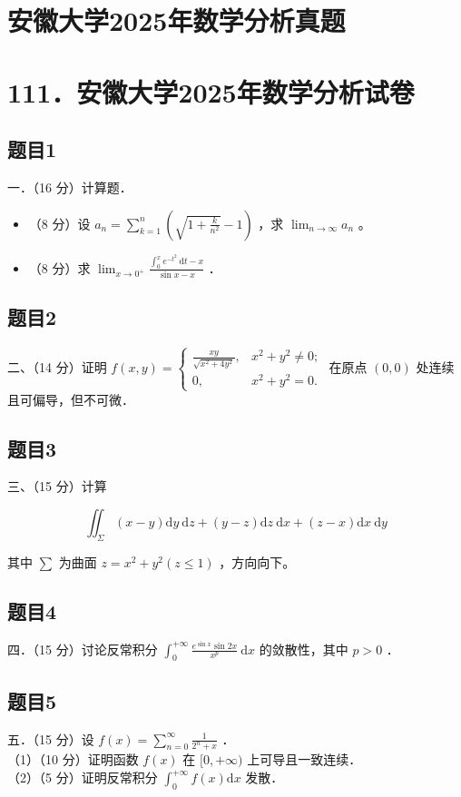\documentclass{article}
\begin{document}
\section*{安徽大学2025年数学分析真题}
\section*{111．安徽大学2025年数学分析试卷}

\subsection{题目1}
一．（16 分）计算题．

\begin{itemize}
  \item[（1）] （8 分）设 \(a_{n}=\sum_{k=1}^{n}\left(\sqrt{1+\frac{k}{n^{2}}}-1\right)\) ，求 \(\lim _{n \rightarrow \infty} a_{n}\) 。
  \item[（2）] （8 分）求 \(\lim _{x \rightarrow 0^{+}} \frac{\int_{0}^{x} e^{-t^{2}} \mathrm{~d} t-x}{\sin x-x}\) ．
\end{itemize}

\subsection{题目2}
二、（14 分）证明 \(f(x, y)=\left\{\begin{array}{ll}\frac{x y}{\sqrt{x^{2}+4 y^{2}}}, & x^{2}+y^{2} \neq 0 ; \\ 0, & x^{2}+y^{2}=0 .\end{array}\right.\) 在原点 \((0,0)\) 处连续且可偏导，但不可微．

\subsection{题目3}
三、（15 分）计算

\[
\iint_{\Sigma}(x-y) \mathrm{d} y \mathrm{~d} z+(y-z) \mathrm{d} z \mathrm{~d} x+(z-x) \mathrm{d} x \mathrm{~d} y
\]

其中 \(\sum\) 为曲面 \(z=x^{2}+y^{2}(z \leq 1)\) ，方向向下。

\subsection{题目4}
四．（15 分）讨论反常积分 \(\int_{0}^{+\infty} \frac{e^{\sin x} \sin 2 x}{x^{p}} \mathrm{~d} x\) 的敛散性，其中 \(p>0\) ．

\subsection{题目5}
五．（15 分）设 \(f(x)=\sum_{n=0}^{\infty} \frac{1}{2^{n}+x}\) ．\\
（1）（10 分）证明函数 \(f(x)\) 在 \([0,+\infty)\) 上可导且一致连续．\\
（2）（5 分）证明反常积分 \(\int_{0}^{+\infty} f(x) \mathrm{d} x\) 发散．
\end{document}
